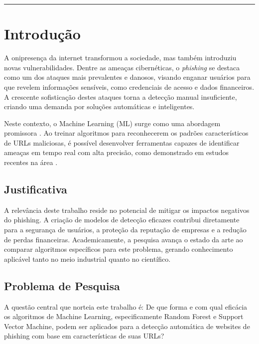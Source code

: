 \documentclass[12pt]{article}
\begin{document}

\vspace*{20pt} \hrule height 1.5pt


\section{Introdução}

A onipresença da internet transformou a sociedade, mas também introduziu novas vulnerabilidades. Dentre as ameaças cibernéticas, o \textit{phishing} se destaca como um dos ataques mais prevalentes e danosos, visando enganar usuários para que revelem informações sensíveis, como credenciais de acesso e dados financeiros. A crescente sofisticação destes ataques torna a detecção manual insuficiente, criando uma demanda por soluções automáticas e inteligentes.

Neste contexto, o Machine Learning (ML) surge como uma abordagem promissora \parencite{hastie2009elements}. Ao treinar algoritmos para reconhecerem os padrões característicos de URLs maliciosas, é possível desenvolver ferramentas capazes de identificar ameaças em tempo real com alta precisão, como demonstrado em estudos recentes na área \parencite{mandadi2022}.

\subsection{Justificativa}
A relevância deste trabalho reside no potencial de mitigar os impactos negativos do phishing. A criação de modelos de detecção eficazes contribui diretamente para a segurança de usuários, a proteção da reputação de empresas e a redução de perdas financeiras. Academicamente, a pesquisa avança o estado da arte ao comparar algoritmos específicos para este problema, gerando conhecimento aplicável tanto no meio industrial quanto no científico.

\subsection{Problema de Pesquisa}
A questão central que norteia este trabalho é: De que forma e com qual eficácia os algoritmos de Machine Learning, especificamente Random Forest e Support Vector Machine, podem ser aplicados para a detecção automática de websites de phishing com base em características de suas URLs?
\end{document}
